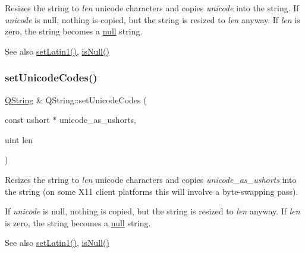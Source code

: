 Resizes the string to {\itshape len} unicode characters and copies {\itshape unicode} into the string. If {\itshape unicode} is null, nothing is copied, but the string is resized to {\itshape len} anyway. If {\itshape len} is zero, the string becomes a \mbox{\hyperlink{class_q_string_a6a6da156364a32ef91e35f83b1955acc}{null}} string.

\begin{DoxySeeAlso}{See also}
\mbox{\hyperlink{class_q_string_ab7df9df250d260fd19067f9c921c0047}{set\+Latin1()}}, \mbox{\hyperlink{class_q_string_a6a6da156364a32ef91e35f83b1955acc}{is\+Null()}} 
\end{DoxySeeAlso}
\mbox{\label{class_q_string_a0c39790333795768528b58602afb36b9}} 
\subsubsection{\texorpdfstring{setUnicodeCodes()}{setUnicodeCodes()}}
{\footnotesize\ttfamily \mbox{\hyperlink{class_q_string}{Q\+String}} \& Q\+String\+::set\+Unicode\+Codes (\begin{DoxyParamCaption}\item[{const ushort $\ast$}]{unicode\+\_\+as\+\_\+ushorts,  }\item[{uint}]{len }\end{DoxyParamCaption})}

Resizes the string to {\itshape len} unicode characters and copies {\itshape unicode\+\_\+as\+\_\+ushorts} into the string (on some X11 client platforms this will involve a byte-\/swapping pass).

If {\itshape unicode} is null, nothing is copied, but the string is resized to {\itshape len} anyway. If {\itshape len} is zero, the string becomes a \mbox{\hyperlink{class_q_string_a6a6da156364a32ef91e35f83b1955acc}{null}} string.

\begin{DoxySeeAlso}{See also}
\mbox{\hyperlink{class_q_string_ab7df9df250d260fd19067f9c921c0047}{set\+Latin1()}}, \mbox{\hyperlink{class_q_string_a6a6da156364a32ef91e35f83b1955acc}{is\+Null()}} 
\end{DoxySeeAlso}
\mbox{\label{class_q_string_ad8e481726eb5a5f368eb1bb23c875847}} 
